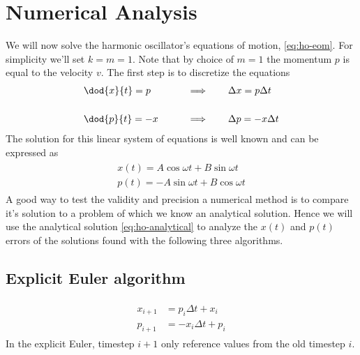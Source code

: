 \section{Numerical Analysis}
We will now solve the harmonic oscillator's equations of motion, \eqref{eq:ho-eom}. For simplicity we'll set $k = m = 1$. Note that by choice of $m=1$ the momentum $p$ is equal to the velocity $v$. The first step is to discretize the equations
\begin{alignat}{2}
&\dod{x}{t} = p  & \qquad \implies \qquad &\Delta x = p \Delta t \\[0.5cm]
&\dod{p}{t} = - x & \qquad \implies \qquad &\Delta p = - x \Delta t
\end{alignat}
The solution for this linear system of equations is well known and can be expressed as
\begin{align}
\begin{split}
\label{eq:ho-analytical}
x(t) = A \cos{\omega t} + B \sin{\omega t} \\
p(t) = -A \sin{\omega t} + B \cos{\omega t}
\end{split}
\end{align}
A good way to test the validity and precision a numerical method is to compare it's solution to a problem of which we know an analytical solution. Hence we will use the analytical solution \eqref{eq:ho-analytical} to analyze the $x(t)$ and $p(t)$ errors of the solutions found with the following three algorithms.

\subsection{Explicit Euler algorithm}
\begin{align}
\begin{split}
\label{al:ho-euler_e}
x_{i+1} &= p_i\Delta t + x_i \\
p_{i+1} &= -x_i\Delta t + p_i
\end{split}
\end{align}
In the explicit Euler, timestep $i+1$ only reference values from the old timestep $i$.

